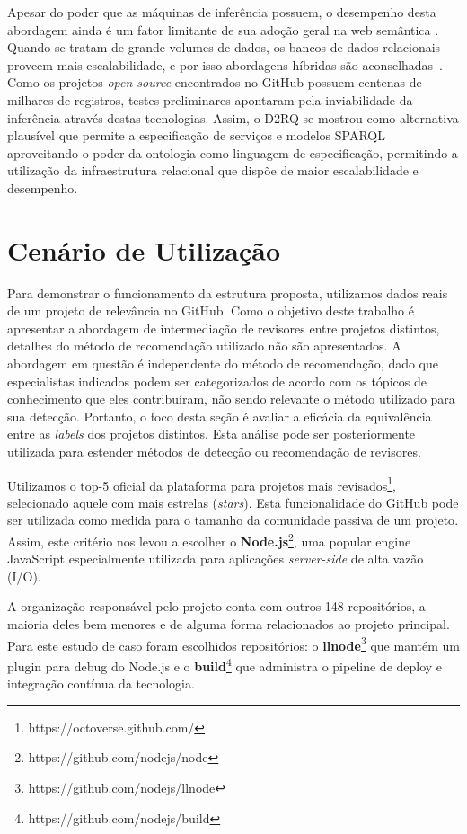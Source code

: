 \documentclass[peerreview]{acmart}
\begin{document}
Apesar do poder que as máquinas de inferência possuem, o desempenho desta abordagem ainda é um fator limitante de sua adoção geral na web semântica \cite{shvaiko2013}. Quando se tratam de grande volumes de dados, os bancos de dados relacionais proveem mais escalabilidade, e por isso abordagens híbridas são aconselhadas~\cite{hepp2008}. Como os projetos \textit{open source} encontrados no GitHub possuem centenas de milhares de registros, testes preliminares apontaram pela inviabilidade da inferência através destas tecnologias. Assim, o D2RQ se mostrou como alternativa plausível que permite a especificação de serviços e modelos SPARQL aproveitando o poder da ontologia como linguagem de especificação, permitindo a utilização da infraestrutura relacional que dispõe de maior escalabilidade e desempenho.


\section{Cenário de Utilização}

Para demonstrar o funcionamento da estrutura proposta, utilizamos dados reais de um projeto de relevância no GitHub. Como o objetivo deste trabalho é apresentar a abordagem de intermediação de revisores entre projetos distintos, detalhes do método de recomendação utilizado não são apresentados. A abordagem em questão é independente do método de recomendação, dado que especialistas indicados podem ser categorizados de acordo com os tópicos de conhecimento que eles contribuíram, não sendo relevante o método utilizado para sua detecção. Portanto, o foco desta seção é avaliar a eficácia da equivalência entre as \textit{labels} dos projetos distintos. Esta análise pode ser posteriormente utilizada para estender métodos de detecção ou recomendação de revisores.

Utilizamos o top-5 oficial da plataforma para projetos mais revisados\footnote{https://octoverse.github.com/}, selecionado aquele com mais estrelas (\textit{stars}). Esta funcionalidade do GitHub pode ser utilizada como medida para o tamanho da comunidade passiva de um projeto\cite{sheoran2014}. Assim, este critério nos levou a escolher o \textbf{Node.js}\footnote{https://github.com/nodejs/node}, uma popular engine JavaScript especialmente utilizada para aplicações \textit{server-side} de alta vazão (I/O).

A organização responsável pelo projeto conta com outros 148 repositórios, a maioria deles bem menores e de alguma forma relacionados ao projeto principal. Para este estudo de caso foram escolhidos repositórios: o \textbf{llnode}\footnote{https://github.com/nodejs/llnode} que mantém um plugin para debug do Node.js e o \textbf{build}\footnote{https://github.com/nodejs/build} que administra o pipeline de deploy e integração contínua da tecnologia.
\end{document}
